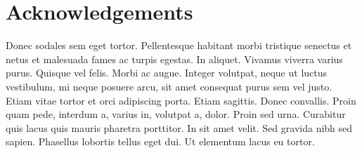 \part{Acknowledgements}
Donec sodales sem eget tortor. Pellentesque habitant morbi tristique senectus et netus et malesuada fames ac turpis egestas. In aliquet. Vivamus viverra varius purus. Quisque vel felis. Morbi ac augue. Integer volutpat, neque ut luctus vestibulum, mi neque posuere arcu, sit amet consequat purus sem vel justo. Etiam vitae tortor et orci adipiscing porta. Etiam sagittis. Donec convallis. Proin quam pede, interdum a, varius in, volutpat a, dolor. Proin sed urna. Curabitur quis lacus quis mauris pharetra porttitor. In sit amet velit. Sed gravida nibh sed sapien. Phasellus lobortis tellus eget dui. Ut elementum lacus eu tortor.

